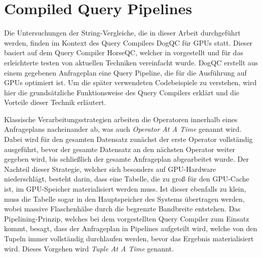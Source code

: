 \chapter{Compiled Query Pipelines}

Die Untersuchungen der String-Vergleiche, die in dieser Arbeit durchgeführt werden, finden im Kontext des Query Compilers DogQC für GPUs statt.
Dieser basiert auf dem Query Compiler HorseQC, welcher in \cite{Funke2018} vorgestellt und für das erleichterte testen von aktuellen Techniken vereinfacht wurde.
DogQC erstellt aus einem gegebenen Anfrageplan eine Query Pipeline, die für die Ausführung auf GPUs optimiert ist.
Um die später verwendeten Codebeispiele zu verstehen, wird hier die grundsätzliche Funktionsweise des Query Compilers erklärt und die Vorteile dieser Technik erläutert.

Klassische Verarbeitungsstrategien arbeiten die Operatoren innerhalb eines Anfrageplans nacheinander ab, was auch \emph{Operator At A Time} genannt wird.
Dabei wird für den gesamten Datensatz zunächst der erste Operator vollständig ausgeführt, bevor der gesamte Datensatz an den nächsten Operator weiter gegeben wird, bis schließlich der gesamte Anfrageplan abgearbeitet wurde.
Der Nachteil dieser Strategie, welcher sich besonders auf GPU-Hardware niederschlägt, besteht darin, dass eine Tabelle, die zu groß für den GPU-Cache ist, im GPU-Speicher materialisiert werden muss.
Ist dieser ebenfalls zu klein, muss die Tabelle sogar in den Hauptspeicher des Systems übertragen werden, wobei massive Flaschenhälse durch die begrenzte Bandbreite entstehen.
Das Pipelining-Prinzip, welches bei dem vorgestellten Query Compiler zum Einsatz kommt, besagt, dass der Anfrageplan in Pipelines aufgeteilt wird, welche von den Tupeln immer vollständig durchlaufen werden, bevor das Ergebnis materialisiert wird.
Dieses Vorgehen wird \emph{Tuple At A Time} genannt.

